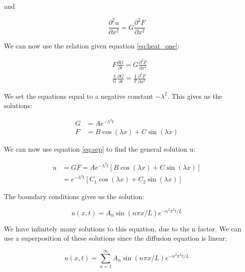 \documentclass{article}
\begin{document}
and

\begin{equation*}
\frac{\partial^2 u}{\partial x^2} = G \frac{\partial^2 F}{\partial x^2}
\end{equation*}

We can now use the relation given equation \ref{eq:heat_one}:

\begin{equation}
\begin{split}
&F\frac{\partial G}{\partial t} = G \frac{\partial ^2 F}{\partial x^2}\\
&\frac{1}{G}\frac{\partial G}{\partial t} = \frac{1}{F} \frac{\partial^2 F}{\partial x^2}
\end{split}
\end{equation}

We set the equations equal to a negative constant $-\lambda^2$. This gives us the solutions:

\begin{equation*}
\begin{split}
G &= Ae^{-\lambda^2 t}\\
F &= B\cos{(\lambda x)} + C\sin{(\lambda x)}
\end{split}
\end{equation*} 

We can now use equation \ref{eq:sep} to find the general solution u:

\begin{equation}
\begin{split}
u &= GF = Ae^{-\lambda^2 t} [B\cos{(\lambda x)} + C\sin{(\lambda x)}]\\
&=e^{-\lambda^2 t} [C_1\cos{(\lambda x)} + C_2\sin{(\lambda x)}]
\end{split}
\end{equation}

The boundary conditions gives us the solution:

\begin{equation}
u(x,t) = A_n\sin{(n\pi x/L)}e^{-n^2\pi^2t/L}
\end{equation}

We have infinitely many solutions to this equation, due to the n factor. We can use a superposition of these solutions since the diffusion equation is linear:

\begin{equation}
u(x,t) = \sum_{n=1}^{\infty}A_n\sin{(n\pi x/L)}e^{-n^2\pi^2t/L}
\label{eq:u_undfA}
\end{equation}
\end{document}
